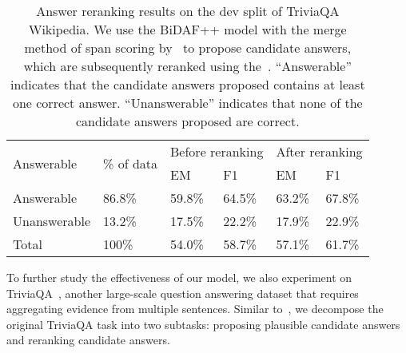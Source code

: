 \documentclass{article} \usepackage{iclr2019_conference,times}
\begin{document}
\begin{table}[ht]
\centering
\begin{tabular}{@{}llllll@{}}
\toprule
\multirow{2}{*}{Answerable} & \multirow{2}{*}{\% of data} & \multicolumn{2}{l}{Before reranking} & \multicolumn{2}{l}{After reranking} \\ \cmidrule(l){3-6} 
                            &                             & EM                & F1               & EM               & F1               \\ \midrule
Answerable                  & 86.8\%                      & 59.8\%            & 64.5\%           & 63.2\%           & 67.8\%           \\
Unanswerable                & 13.2\%                      & 17.5\%            & 22.2\%           & 17.9\%           & 22.9\%           \\
Total                       & 100\%                       & 54.0\%            & 58.7\%           & 57.1\%           & 61.7\%           \\ \bottomrule
\end{tabular}
\caption{
Answer reranking results on the dev split of TriviaQA Wikipedia.
We use the BiDAF++ model with the merge method of span scoring by~\citet{clark2018simple} to propose candidate answers, which are subsequently reranked using the~\modelnameshort.
``Answerable'' indicates that the candidate answers proposed contains at least one correct answer.
``Unanswerable'' indicates that none of the candidate answers proposed are correct.
}
\label{tab:triviaqa}
\end{table}



To further study the effectiveness of our model, we also experiment on TriviaQA~\citep{Joshi2017TriviaQA}, another large-scale question answering dataset that requires aggregating evidence from multiple sentences.
Similar to~\citet{hu2018read,wang2018evidence}, we decompose the original TriviaQA task into two subtasks: proposing plausible candidate answers and reranking candidate answers.
\end{document}
